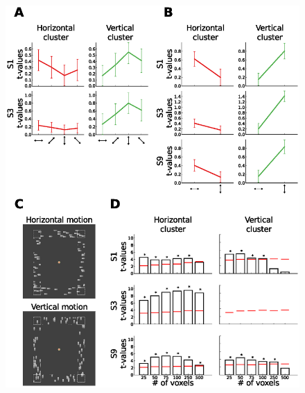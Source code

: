 \begin{figure}[htb!]
\captionsetup{labelformat=empty}
\centering
\includegraphics[width=\textwidth]{figures/chapter_03_SI/figS7.eps}
\caption{}
\end{figure}

